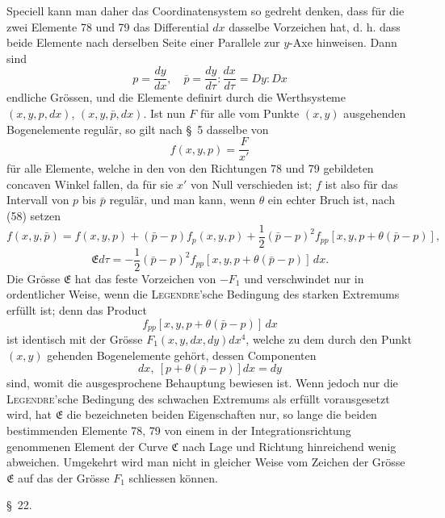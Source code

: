 \documentclass[11pt,a4paper,leqno]{article}
\begin{document}
Speciell kann man daher das Coordinatensystem so gedreht denken, dass für die zwei Elemente 78 und 79 das Differential $dx$ dasselbe Vorzeichen hat, d. h. dass beide Elemente nach derselben Seite einer Parallele zur $y$-Axe hinweisen. Dann sind
\[
p=\frac{dy}{dx},\quad
\bar{p}=\frac{dy}{d\tau}:\frac{dx}{d\tau}=D y:D x
\]
endliche Grössen, und die Elemente definirt durch die Werthsysteme $(x,y,p,dx)$, $(x,y,\bar{p},dx)$. Ist nun $F$ für alle vom Punkte $(x,y)$ ausgehenden Bogenelemente regulär, so gilt nach \S~5 dasselbe von
\[
f(x,y,p)=\frac{F}{x'}
\]
für alle Elemente, welche in den von den Richtungen 78 und 79 gebildeten concaven Winkel fallen, da für sie $x'$ von Null verschieden ist; $f$ ist also für das Intervall von $p$ bis $\bar{p}$ regulär, und man kann, wenn $\theta$ ein echter Bruch ist, nach (58) setzen
\[
f(x,y,\bar{p})=f(x,y,p)+(\bar{p}-p)f_p(x,y,p)
+\frac{1}{2}(\bar{p}-p)^2 f_{pp}[x,y,p+\theta(\bar{p}-p)],
\]
\begin{equation}\tag{60}
\mathfrak{E}d\tau
=
-\frac{1}{2}(\bar{p}-p)^2 f_{pp}[x,y,p+\theta(\bar{p}-p)]\,dx.
\end{equation}
Die Grösse $\mathfrak{E}$ hat das feste Vorzeichen von $-F_1$ und verschwindet nur in ordentlicher Weise, wenn die \textsc{Legendre}'sche Bedingung des starken Extremums erfüllt ist; denn das Product
\[
f_{pp}[x,y,p+\theta(\bar{p}-p)]\,dx
\]
ist identisch mit der Grösse $F_1(x,y,dx,dy)dx^4$, welche zu dem durch den Punkt $(x,y)$ gehenden Bogenelemente gehört, dessen Componenten
\[
dx,\ [p+\theta(\bar{p}-p)]dx=dy
\]
sind, womit die ausgesprochene Behauptung bewiesen ist. Wenn jedoch nur die \textsc{Legendre}'sche Bedingung des schwachen Extremums als erfüllt vorausgesetzt wird, hat $\mathfrak{E}$ die bezeichneten beiden Eigenschaften nur, so lange die beiden bestimmenden Elemente 78, 79 von einem in der Integrationsrichtung genommenen Element der Curve $\mathfrak{C}$ nach Lage und Richtung hinreichend wenig abweichen. Umgekehrt wird man nicht in gleicher Weise vom Zeichen der Grösse $\mathfrak{E}$ auf das der Grösse $F_1$ schliessen können.



\begin{center}{\large \S~22.}\end{center}
\end{document}
